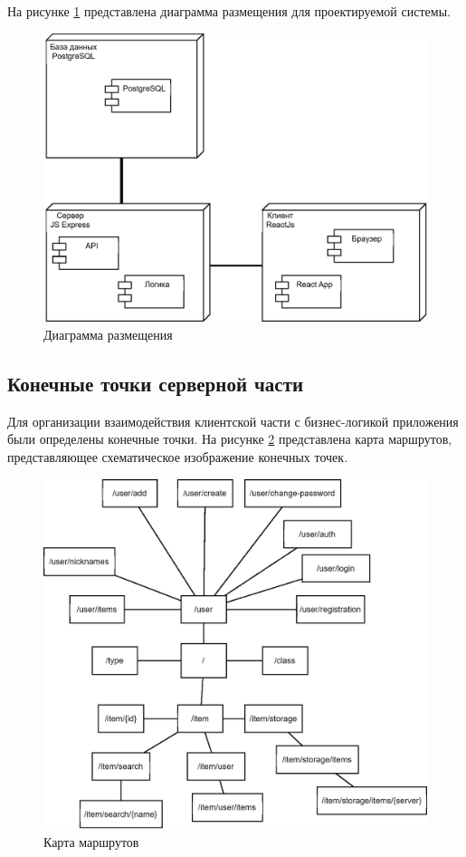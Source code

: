 На рисунке \ref{fig:diagrazm} представлена диаграмма размещения для проектируемой системы.

\vspace{-8mm} %
\begin{figure}[h]
	\includegraphics[width=0.5\linewidth]{images/diagrazm}
	\caption{Диаграмма размещения}
	\label{fig:diagrazm}
\end{figure}

\subsection{Конечные точки серверной части}

Для организации взаимодействия клиентской части с бизнес-логикой приложения были определены конечные точки. На рисунке \ref{fig:routes} представлена карта маршрутов, представляющее схематическое изображение конечных точек.

\begin{figure}
	\centering
	\includegraphics[width=0.7\linewidth]{images/routes}
	\caption{Карта маршрутов}
	\label{fig:routes}
\end{figure}

